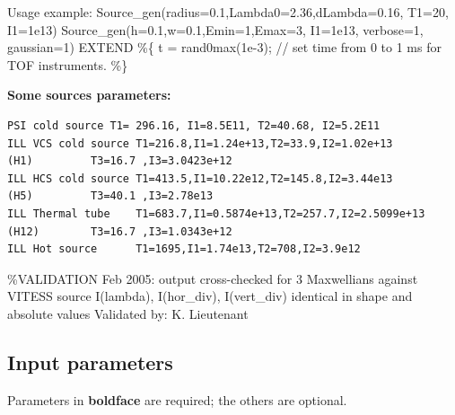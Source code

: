 Usage example: Source\_gen(radius=0.1,Lambda0=2.36,dLambda=0.16, T1=20, I1=1e13) Source\_gen(h=0.1,w=0.1,Emin=1,Emax=3, I1=1e13, verbose=1, gaussian=1) EXTEND \%\{ t = rand0max(1e-3); // set time from 0 to 1 ms for TOF instruments. \%\}

\textbf{Some sources parameters:}

\begin{verbatim}
PSI cold source T1= 296.16, I1=8.5E11, T2=40.68, I2=5.2E11
ILL VCS cold source T1=216.8,I1=1.24e+13,T2=33.9,I2=1.02e+13
(H1)         T3=16.7 ,I3=3.0423e+12
ILL HCS cold source T1=413.5,I1=10.22e12,T2=145.8,I2=3.44e13
(H5)         T3=40.1 ,I3=2.78e13
ILL Thermal tube    T1=683.7,I1=0.5874e+13,T2=257.7,I2=2.5099e+13
(H12)        T3=16.7 ,I3=1.0343e+12
ILL Hot source      T1=1695,I1=1.74e13,T2=708,I2=3.9e12
\end{verbatim}

\%VALIDATION Feb 2005: output cross-checked for 3 Maxwellians against VITESS source I(lambda), I(hor\_div), I(vert\_div) identical in shape and absolute values Validated by: K. Lieutenant

\subsection*{Input parameters}
Parameters in \textbf{boldface} are required; the others are optional.

